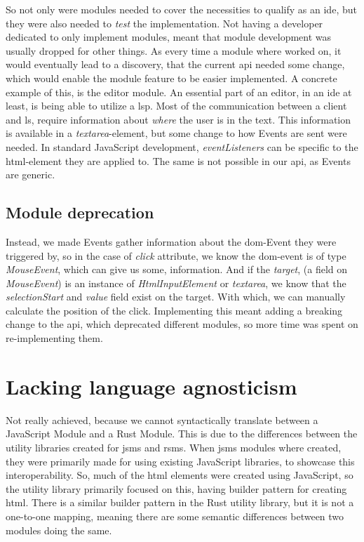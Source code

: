 So not only were modules needed to cover the necessities to qualify as an
\gls*{ide}, but they were also needed to \textit{test} the implementation. Not
having a developer dedicated to only implement modules, meant that module
development was usually dropped for other things. As every time a module where
worked on, it would eventually lead to a discovery, that the current \gls*{api}
needed some change, which would enable the module feature to be easier
implemented. A concrete example of this, is the editor module.
An essential part of an editor, in an \gls*{ide} at least, is being able to
utilize a \gls*{lsp}. Most of the communication between a client and \gls*{ls},
require information about \textit{where} the user is in the text. This
information is available in a \textit{textarea}-element, but some change to how
Events are sent were needed. In standard JavaScript development,
\textit{eventListeners} can be specific to the \gls*{html}-element they are
applied to. The same is not possible in our \gls*{api}, as Events are generic.


\subsection{Module deprecation}

Instead, we made Events gather information about the \gls*{dom}-Event they were
triggered by, so in the case of \textit{click} attribute, we know the
\gls*{dom}-event is of type \textit{MouseEvent}, which can give us some,
information. And if the \textit{target}, (a field on \textit{MouseEvent}) is an
instance of \textit{HtmlInputElement} or \textit{textarea}, we know that the
\textit{selectionStart} and \textit{value} field exist on the target. With
which, we can manually calculate the position of the click. Implementing this
meant adding a breaking change to the \gls*{api}, which deprecated different
modules, so more time was spent on re-implementing them.


\section{Lacking language agnosticism} \label{sec:lla}

Not really achieved, because we cannot syntactically translate between a
JavaScript Module and a Rust Module. This is due to the differences between the
utility libraries created for \gls*{jsms} and \gls*{rsms}. When \gls*{jsms} modules
where created, they were primarily made for using existing JavaScript libraries,
to showcase this interoperability. So, much of the \gls*{html} elements were
created using JavaScript, so the utility library primarily focused on this,
having builder pattern for creating \gls*{html}. There is a similar builder
pattern in the Rust utility library, but it is not a one-to-one mapping, meaning
there are some semantic differences between two modules doing the same.

